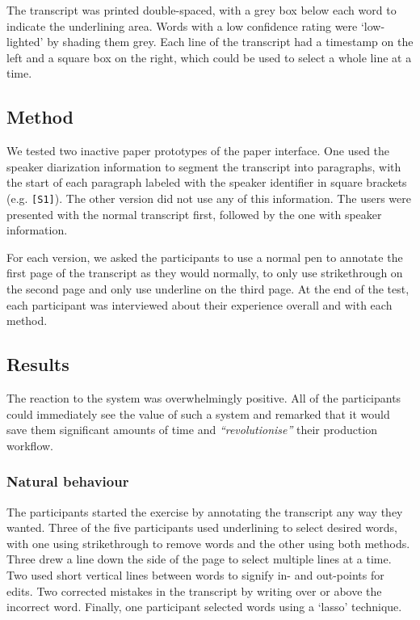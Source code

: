 The transcript was printed double-spaced, with a grey box below each word to
indicate the underlining area.  Words with a low confidence rating were
`low-lighted' by shading them grey.  Each line of the transcript had a
timestamp on the left and a square box on the right, which could be used to
select a whole line at a time.

\subsection{Method}
We tested two inactive paper prototypes of the paper interface.
One used the speaker diarization information 
to segment the transcript into paragraphs, with the start of each paragraph
labeled with the speaker identifier in square brackets (e.g.
\texttt{{[}S1{]}}). The other version did not use any of this 
information. The users were presented with the normal transcript first,
followed by the one with speaker information.

For each version, we asked the participants to use a normal pen to annotate the
first page of the transcript as they would normally, to only use strikethrough
on the second page and only use underline on the third page. At the end of the
test, each participant was interviewed about their experience overall and
with each method.

\subsection{Results}
The reaction to the system was overwhelmingly positive. All of the
participants could immediately see the value of such a system and remarked that
it would save them significant amounts of time and \textit{``revolutionise''}
their production workflow.

\subsubsection{Natural behaviour}
The participants started the exercise by annotating the transcript any way they
wanted.  Three of the five participants used underlining to select desired
words, with one using strikethrough to remove words and the other using both
methods.  Three drew a line down the side of the page to select multiple lines
at a time.  Two used short vertical lines between words to signify in- and
out-points for edits.  Two corrected mistakes in the transcript by writing over
or above the incorrect word. Finally, one participant selected words using a
`lasso' technique.

